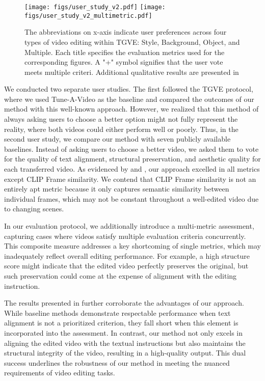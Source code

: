 \begin{figure*}[!h]
    \centering
    \texttt{[image: figs/user\_study\_v2.pdf]}
    \texttt{[image: figs/user\_study\_v2\_multimetric.pdf]}
    \caption{The abbreviations on x-axis indicate user preferences across four types of video editing within TGVE: Style, Background, Object, and Multiple. Each title specifies the evaluation metrics used for the corresponding figures. A "+" symbol signifies that the user vote meets multiple criteri. Additional qualitative results are presented in 
    }
    \label{fig:protocol2}
\end{figure*}

We conducted two separate user studies. The first followed the TGVE protocol, where we used Tune-A-Video as the baseline and compared the outcomes of our method with this well-known approach. However, we realized that this method of always asking users to choose a better option might not fully represent the reality, where both videos could either perform well or poorly. Thus, in the second user study, we compare our method with seven publicly available baselines. Instead of asking users to choose a better video, we asked them to vote for the quality of text alignment, structural preservation, and aesthetic quality for each transferred video. As evidenced by  and , our approach excelled in all metrics except CLIP Frame similarity. We contend that CLIP Frame similarity is not an entirely apt metric because it only captures semantic similarity between individual frames, which may not be constant throughout a well-edited video due to changing scenes.

In our evaluation protocol, we additionally introduce a multi-metric assessment, capturing cases where videos satisfy multiple evaluation criteria concurrently. This composite measure addresses a key shortcoming of single metrics, which may inadequately reflect overall editing performance. For example, a high structure score might indicate that the edited video perfectly preserves the original, but such preservation could come at the expense of alignment with the editing instruction.

The results presented in  further corroborate the advantages of our approach. While baseline methods demonstrate respectable performance when text alignment is not a prioritized criterion, they fall short when this element is incorporated into the assessment. In contrast, our method not only excels in aligning the edited video with the textual instructions but also maintains the structural integrity of the video, resulting in a high-quality output. This dual success underlines the robustness of our method in meeting the nuanced requirements of video editing tasks.


